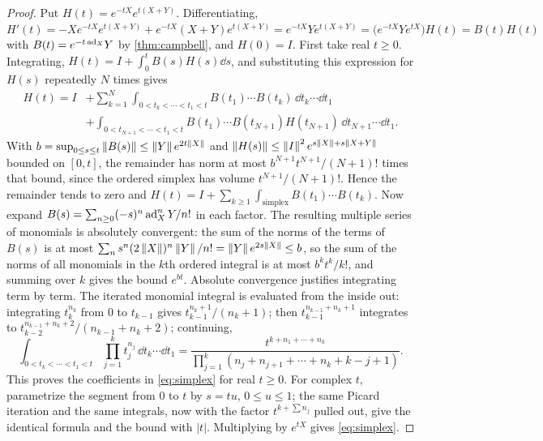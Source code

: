 \begin{proof}
Put $H(t)=e^{-tX}e^{t(X+Y)}$. Differentiating,
$H'(t)=-Xe^{-tX}e^{t(X+Y)}+e^{-tX}(X+Y)e^{t(X+Y)}=e^{-tX}Ye^{t(X+Y)}
=\bigl(e^{-tX}Ye^{tX}\bigr)H(t)=B(t)H(t)$ with $B(t)=e^{-t\operatorname{ad}_X}Y$ by
\cref{thm:campbell}, and $H(0)=I$. First take real $t\geq0$. Integrating,
$H(t)=I+\int_0^tB(s)H(s)\dd s$, and substituting this expression for $H(s)$
repeatedly $N$ times gives
\begin{align*}
 H(t)=I&+\sum_{k=1}^{N}\int_{0<t_k<\cdots<t_1<t}B(t_1)\cdots B(t_k)\,\dd t_k\cdots\dd t_1\\
 &+\int_{0<t_{N+1}<\cdots<t_1<t}B(t_1)\cdots B(t_{N+1})H(t_{N+1})\,\dd t_{N+1}\cdots\dd t_1.
\end{align*}
With $b=\sup_{0\leq s\leq t}\left\lVert B(s)\right\rVert\leq\left\lVert Y\right\rVert e^{2t\left\lVert X\right\rVert}$ and
$\left\lVert H(s)\right\rVert\leq\left\lVert I\right\rVert^2e^{s\left\lVert X\right\rVert+s\left\lVert X+Y\right\rVert}$ bounded on $[0,t]$, the
remainder has norm at most $b^{N+1}t^{N+1}/(N+1)!$ times that bound, since
the ordered simplex has volume $t^{N+1}/(N+1)!$. Hence the remainder tends
to zero and $H(t)=I+\sum_{k\geq1}\int_{\text{simplex}}B(t_1)\cdots B(t_k)$.
Now expand $B(s)=\sum_{n\geq0}(-s)^n\operatorname{ad}_X^nY/n!$ in each factor. The
resulting multiple series of monomials is absolutely convergent: the sum of
the norms of the terms of $B(s)$ is at most
$\sum_n s^n(2\left\lVert X\right\rVert)^n\left\lVert Y\right\rVert/n!=\left\lVert Y\right\rVert e^{2s\left\lVert X\right\rVert}\leq b$, so the sum
of the norms of all monomials in the $k$th ordered integral is at most
$b^kt^k/k!$, and summing over $k$ gives the bound $e^{bt}$. Absolute
convergence justifies integrating term by term. The iterated monomial
integral is evaluated from the inside out: integrating $t_k^{n_k}$ from $0$
to $t_{k-1}$ gives $t_{k-1}^{n_k+1}/(n_k+1)$; then
$t_{k-1}^{n_{k-1}+n_k+1}$ integrates to $t_{k-2}^{n_{k-1}+n_k+2}/(n_{k-1}+n_k+2)$;
continuing,
\[
 \int_{0<t_k<\cdots<t_1<t}\prod_{j=1}^kt_j^{n_j}\,\dd t_k\cdots\dd t_1
 =\frac{t^{k+n_1+\cdots+n_k}}{\prod_{j=1}^{k}(n_j+n_{j+1}+\cdots+n_k+k-j+1)}.
\]
This proves the coefficients in \eqref{eq:simplex} for real $t\geq0$.
For complex $t$, parametrize the segment from $0$ to $t$ by $s=tu$,
$0\leq u\leq1$; the same Picard iteration and the same integrals, now with
the factor $t^{k+\sum n_j}$ pulled out, give the identical formula and the
bound with $|t|$. Multiplying by $e^{tX}$ gives \eqref{eq:simplex}.
\end{proof}

